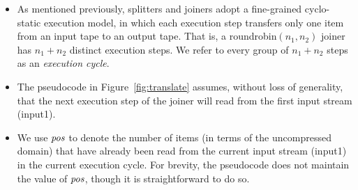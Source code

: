 \begin{itemize}

\vspace{4pt} \item As mentioned previously, splitters and joiners
  adopt a fine-grained cyclo-static execution model, in which each
  execution step transfers only one item from an input tape to an
  output tape.  That is, a roundrobin$(n_1, n_2)$ joiner has $n_1 +
  n_2$ distinct execution steps.  We refer to every group of $n_1 +
  n_2$ steps as an {\it execution cycle}.

\vspace{4pt} \item The pseudocode in Figure~\ref{fig:translate}
  assumes, without loss of generality, that the next execution step of
  the joiner will read from the first input stream (input1).

\vspace{4pt} \item We use $\mbox{\it pos}$ to denote the number of items (in
  terms of the uncompressed domain) that have already been read from
  the current input stream (input1) in the current execution cycle.
  For brevity, the pseudocode does not maintain the value of $\mbox{\it pos}$,
  though it is straightforward to do so.

\end{itemize}

